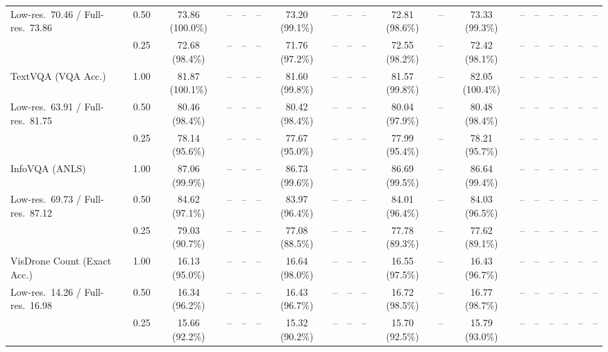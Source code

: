 \begin{table}[t]
{\begin{tabular}{l c | c c c c | c c c c | c c | c c c | c c c c}
{\footnotesize Low-res.\ 70.46 / Full-res.\ 73.86} & 0.50 & \cellcolor{gray!15}73.86 (100.0\%) & -- & -- & -- & \cellcolor{gray!15}73.20 (99.1\%) & -- & -- & -- & \cellcolor{gray!15}72.81 (98.6\%) & -- & \cellcolor{gray!15}73.33 (99.3\%) & -- & -- & -- & -- & -- & -- \\
 & 0.25 & \cellcolor{gray!15}72.68 (98.4\%) & -- & -- & -- & 71.76 (97.2\%) & -- & -- & -- & \cellcolor{gray!15}72.55 (98.2\%) & -- & \cellcolor{gray!15}72.42 (98.1\%) & -- & -- & -- & -- & -- & -- \\
\cmidrule(lr){1-19}
TextVQA (VQA Acc.) & 1.00 & \cellcolor{gray!15}81.87 (100.1\%) & -- & -- & -- & \cellcolor{gray!15}81.60 (99.8\%) & -- & -- & -- & \cellcolor{gray!15}81.57 (99.8\%) & -- & \cellcolor{gray!15}82.05 (100.4\%) & -- & -- & -- & -- & -- & -- \\
{\footnotesize Low-res.\ 63.91 / Full-res.\ 81.75} & 0.50 & \cellcolor{gray!15}80.46 (98.4\%) & -- & -- & -- & \cellcolor{gray!15}80.42 (98.4\%) & -- & -- & -- & 80.04 (97.9\%) & -- & \cellcolor{gray!15}80.48 (98.4\%) & -- & -- & -- & -- & -- & -- \\
 & 0.25 & 78.14 (95.6\%) & -- & -- & -- & 77.67 (95.0\%) & -- & -- & -- & 77.99 (95.4\%) & -- & 78.21 (95.7\%) & -- & -- & -- & -- & -- & -- \\
\cmidrule(lr){1-19}
InfoVQA (ANLS) & 1.00 & \cellcolor{gray!15}87.06 (99.9\%) & -- & -- & -- & \cellcolor{gray!15}86.73 (99.6\%) & -- & -- & -- & \cellcolor{gray!15}86.69 (99.5\%) & -- & \cellcolor{gray!15}86.64 (99.4\%) & -- & -- & -- & -- & -- & -- \\
{\footnotesize Low-res.\ 69.73 / Full-res.\ 87.12} & 0.50 & 84.62 (97.1\%) & -- & -- & -- & 83.97 (96.4\%) & -- & -- & -- & 84.01 (96.4\%) & -- & 84.03 (96.5\%) & -- & -- & -- & -- & -- & -- \\
 & 0.25 & 79.03 (90.7\%) & -- & -- & -- & 77.08 (88.5\%) & -- & -- & -- & 77.78 (89.3\%) & -- & 77.62 (89.1\%) & -- & -- & -- & -- & -- & -- \\
\cmidrule(lr){1-19}
VisDrone Count (Exact Acc.) & 1.00 & 16.13 (95.0\%) & -- & -- & -- & 16.64 (98.0\%) & -- & -- & -- & 16.55 (97.5\%) & -- & 16.43 (96.7\%) & -- & -- & -- & -- & -- & -- \\
{\footnotesize Low-res.\ 14.26 / Full-res.\ 16.98} & 0.50 & 16.34 (96.2\%) & -- & -- & -- & 16.43 (96.7\%) & -- & -- & -- & \cellcolor{gray!15}16.72 (98.5\%) & -- & \cellcolor{gray!15}16.77 (98.7\%) & -- & -- & -- & -- & -- & -- \\
 & 0.25 & 15.66 (92.2\%) & -- & -- & -- & 15.32 (90.2\%) & -- & -- & -- & 15.70 (92.5\%) & -- & 15.79 (93.0\%) & -- & -- & -- & -- & -- & -- \\

\end{tabular}}
\end{table}
